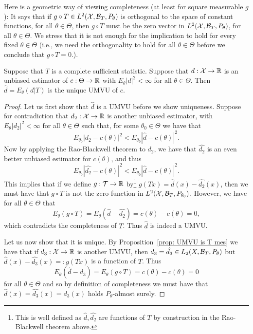 \documentclass[twoside, a4paper, 10pt]{amsart}
\begin{document}
Here is a geometric way of viewing completeness (at least for square measurable $g$): It says that if $g \circ T \in L^2(\mathcal{X}, \mathcal{B}_T, P_{\theta})$ is orthogonal to the space of constant functions, for all $\theta \in \Theta$, then $g \circ T$ must be the zero vector in $L^2(\mathcal{X}, \mathcal{B}_T, P_{\theta})$, for all $\theta \in \Theta$. We stress that it is not enough for the implication to hold for every fixed $\theta \in \Theta$ (i.e., we need the orthogonality to hold for all $\theta \in \Theta$ before we conclude that $g \circ T = 0$.).

\begin{thm} Suppose that $T$ is a complete sufficient statistic. Suppose that $d:\mathcal{X} \to \mathbb{R}$ is an unbiased estimator of $c:\Theta \to \mathbb{R}$ with $E_{\theta}|d|^2 < \infty$ for all $\theta \in \Theta$. Then $\hat{d} = E_{\theta}(d|T)$ is the unique UMVU of $c$.

\end{thm}

\begin{proof} Let us first show that $\hat{d}$ is a UMVU before we show uniqueness. Suppose for contradiction that $d_2:\mathcal{X} \to \mathbb{R}$ is another unbiased estimator, with $E_{\theta}|d_2|^2 < \infty$ for all $\theta \in \Theta$ such that, for some $\theta_0 \in \Theta$ we have that $$E_{\theta_0} |d_2 - c(\theta)|^2 < E_{\theta_0} |\hat{d} - c(\theta)|^2.$$ 
Now by applying the Rao-Blackwell theorem to $d_2$, we have that $\hat{d_2}$ is an even better unbiased estimator for $c(\theta)$, and thus $$E_{\theta_0} |\hat{d_2} - c(\theta)|^2 < E_{\theta_0} |\hat{d} - c(\theta)|^2.$$ This implies that if we define $g:\mathcal{T} \to \mathbb{R}$ by\footnote{This is well defined as $\hat{d}, \hat{d_2}$ are functions of $T$ by construction in the Rao-Blackwell theorem above.} $g(Tx) = \hat{d}(x) - \hat{d_2}(x)$, then we must have that $g \circ T$ is not the zero-function in $L^2(\mathcal{X}, \mathcal{B}_T,P_{\theta_0})$. 
However, we have for all $\theta \in \Theta$ that $$E_{\theta}(g \circ T) = E_{\theta}(\hat{d} - \hat{d_2}) = c(\theta) - c(\theta) = 0,$$ which contradicts the completeness of $T$. Thus $\hat{d}$ is indeed a UMVU.

Let us now show that it is unique. By Proposition~\ref{prop: UMVU is T mes} we have that if $d_3:\mathcal{X} \to \mathbb{R}$ is another UMVU, then $d_3 = \hat{d_3} \in L_2(X, \mathcal{B}_T, P_{\theta})$ but $\hat{d}(x) - \hat{d_3}(x) =: g(Tx)$ is a function of $T$. Thus $$E_{\theta}(\hat{d} - d_3) = E_{\theta}(g\circ T) = c(\theta) - c(\theta) = 0$$ for all $\theta \in \Theta$ and so by definition of completeness we must have that $\hat{d}(x) = \hat{d_3}(x) = d_3(x)$ holds $P_{\theta}$-almost surely. \end{proof}
\end{document}
